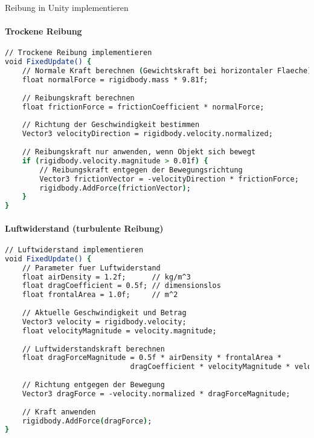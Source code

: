 \begin{KR}{Reibung in Unity implementieren}\\
    \paragraph{Trockene Reibung}
    \begin{lstlisting}[language=csh, style=basesmol]
// Trockene Reibung implementieren
void FixedUpdate() {
    // Normale Kraft berechnen (Gewichtskraft bei horizontaler Flaeche)
    float normalForce = rigidbody.mass * 9.81f;
    
    // Reibungskraft berechnen
    float frictionForce = frictionCoefficient * normalForce;
    
    // Richtung der Geschwindigkeit bestimmen
    Vector3 velocityDirection = rigidbody.velocity.normalized;
    
    // Reibungskraft nur anwenden, wenn Objekt sich bewegt
    if (rigidbody.velocity.magnitude > 0.01f) {
        // Reibungskraft entgegen der Bewegungsrichtung
        Vector3 frictionVector = -velocityDirection * frictionForce;
        rigidbody.AddForce(frictionVector);
    }
}
    \end{lstlisting}
    
    \paragraph{Luftwiderstand (turbulente Reibung)}
    \begin{lstlisting}[language=csh, style=basesmol]
// Luftwiderstand implementieren
void FixedUpdate() {
    // Parameter fuer Luftwiderstand
    float airDensity = 1.2f;      // kg/m^3
    float dragCoefficient = 0.5f; // dimensionslos
    float frontalArea = 1.0f;     // m^2
    
    // Aktuelle Geschwindigkeit und Betrag
    Vector3 velocity = rigidbody.velocity;
    float velocityMagnitude = velocity.magnitude;
    
    // Luftwiderstandskraft berechnen
    float dragForceMagnitude = 0.5f * airDensity * frontalArea * 
                             dragCoefficient * velocityMagnitude * velocityMagnitude;
    
    // Richtung entgegen der Bewegung
    Vector3 dragForce = -velocity.normalized * dragForceMagnitude;
    
    // Kraft anwenden
    rigidbody.AddForce(dragForce);
}
    \end{lstlisting}
\end{KR}

